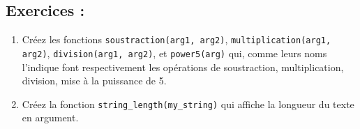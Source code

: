  \subsection{Exercices :}
 \begin{enumerate}
 \item Créez les fonctions \texttt{soustraction(arg1, arg2)}, \texttt{multiplication(arg1, arg2)}, \texttt{division(arg1, arg2)}, et \texttt{power5(arg)} qui, comme leurs noms l'indique font respectivement les opérations de soustraction, multiplication, division, mise à la puissance de 5. 
 \item Créez la fonction \lstinline{string_length(my_string)} qui affiche la longueur du texte en argument.
 \end{enumerate}